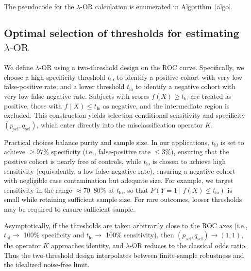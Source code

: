 \documentclass[pdflatex,sn-mathphys-num]{sn-jnl}%
\newcommand{\SPOR}{\textrm{$\lambda$-OR}}
\theoremstyle{thmstyleone}%
\theoremstyle{thmstyletwo}%
\theoremstyle{thmstylethree}%
\begin{document}
The pseudocode for the $\SPOR$ calculation is enumerated in Algorithm~\ref{algo}.

\subsection{Optimal selection of thresholds for estimating $\SPOR$}
We define $\SPOR$ using a two-threshold design on the ROC curve.
Specifically, we choose a high-specificity threshold $t_{\mathrm{hi}}$ to identify
a positive cohort with very low false-positive rate, and a lower threshold
$t_{\mathrm{lo}}$ to identify a negative cohort with very low false-negative rate.
Subjects with scores $f(X) \ge t_{\mathrm{hi}}$ are treated as positive,
those with $f(X) \le t_{\mathrm{lo}}$ as negative, and the intermediate region is excluded.
This construction yields selection-conditional sensitivity and specificity
$(p_{\text{sel}}, q_{\text{sel}})$, which enter directly into the
misclassification operator $K$.

Practical choices balance purity and sample size. In our applications,
$t_{\mathrm{hi}}$ is set to achieve $\geq 97\%$ specificity (i.e., false-positive rate $\le 3\%$), ensuring that the
positive cohort is nearly free of controls, while $t_{\mathrm{lo}}$ is chosen
to achieve high sensitivity (equivalently, a low false-negative rate), ensuring a negative cohort with
negligible case contamination but adequate size. For example, we target sensitivity in the range $\approx 70$--$80\%$ at $t_{\mathrm{lo}}$, so that $P(Y=1\mid f(X)\le t_{\mathrm{lo}})$ is small while retaining sufficient sample size. For rare outcomes, looser
thresholds may be required to ensure sufficient sample.

Asymptotically, if the thresholds are taken arbitrarily close to the ROC axes
(i.e., $t_{\mathrm{hi}} \to$ 100\% specificity and $t_{\mathrm{lo}} \to$ 100\% 
sensitivity), then $(p_{\text{sel}}, q_{\text{sel}}) \to (1,1)$, the operator
$K$ approaches identity, and $\SPOR$ reduces to the classical odds ratio.
Thus the two-threshold design interpolates between finite-sample robustness and the
idealized noise-free limit.
\end{document}
